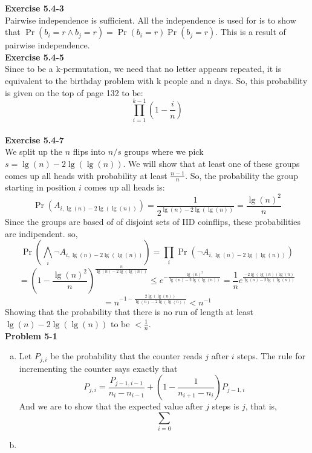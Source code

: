 \documentclass{article}
\begin{document}
\noindent\textbf{Exercise 5.4-3}\\

Pairwise independence is sufficient. All the independence is used for is to show that $\Pr(b_i=r \wedge b_j=r) = \Pr(b_i=r)\Pr(b_j=r)$. This is a result of pairwise independence.\\


\noindent\textbf{Exercise 5.4-5}\\

Since to be a k-permutation, we need that no letter appears repeated, it is equivalent to the birthday problem with k people and n days. So, this probability is given on the top of page 132 to be:
\[
\prod_{i=1}^{k-1} \left(1-\frac{i}{n}\right)
\]\\



\noindent\textbf{Exercise 5.4-7}\\

We split up the $n$ flips into $n/s$ groups where we pick $s = \lg(n) - 2\lg(\lg(n))$. We will show that at least one of these groups comes up all heads with probability at least $\frac{n-1}{n}$. So, the probability the group starting in position $i$ comes up all heads is:
\[
\Pr(A_{i,\lg(n)- 2\lg(\lg(n))}) =\frac{1}{2^{\lg(n)- 2\lg(\lg(n))}} = \frac{\lg(n)^2}{n}
\]
Since the groups are based of of disjoint sets of IID coinflips, these probabilities are indipendent. so, 
\[
\Pr(\bigwedge_{i} \neg A_{i,\lg(n)- 2\lg(\lg(n))}) = \prod_i \Pr(\neg A_{i,\lg(n)- 2\lg(\lg(n))}) \]\[= \left(1 - \frac{\lg(n)^2}{n}\right)^{\frac{n}{\lg(n) - 2\lg(\lg(n))}} \le e^{-\frac{\lg(n)^2}{\lg(n) - 2\lg(\lg(n))}} = \frac{1}{n}e^{\frac{-2\lg(\lg(n))\lg(n)}{\lg(n) - 2\lg(\lg(n))}} 
\]
\[
= n^{-1 - \frac{2\lg(\lg(n))}{\lg(n) - 2\lg(\lg(n))}} < n^{-1}
\]
Showing that the probability that there is no run of length at least $\lg(n) - 2\lg(\lg(n))$ to be $<\frac{1}{n}$.\\




\noindent\textbf{Problem 5-1}\\

\begin{enumerate}[a)]
\item
Let $P_{j,i}$ be the probability that the counter reads $j$ after $i$ steps. The rule for incrementing the counter says exactly that
\[
P_{j,i} = \frac{P_{j-1,i-1}}{n_{i} - n_{i-1}} + \left( 1 - \frac{1}{n_{i+1} - n_i}\right)P_{j-1,i} 
\]
And we are to show that the expected value after $j$ steps is $j$, that is,
\[
\sum_{i=0}
\]

\item

\end{enumerate}
\end{document}
